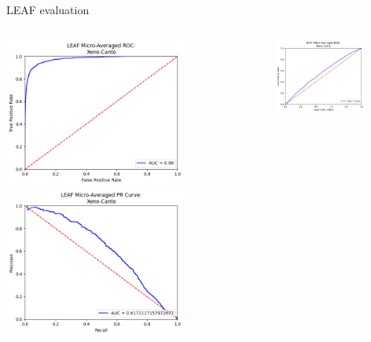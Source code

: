 \begin{frame}{LEAF evaluation}
    \begin{columns}
        \begin{column}{0.5\textwidth}
            \centering
            \includegraphics[height=0.7\textheight,width=0.7\textwidth,keepaspectratio]{images/LEAF-ROC-XC.png}
            \break
            \centering
            \includegraphics[height=0.7\textheight,width=0.7\textwidth,keepaspectratio]{images/LEAF-PR-XC.png}
        \end{column}
        \begin{column}{0.5\textwidth}
            \centering
            \includegraphics[height=0.7\textheight,width=0.7\textwidth,keepaspectratio]{images/LEAF-ROC-snd.png}

\end{column}
\end{columns}
\end{frame}
